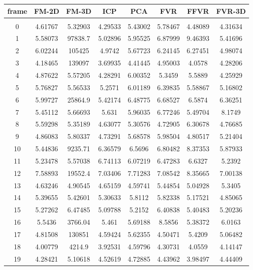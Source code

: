 \begin{center}
\begin{longtable}{cccccccc}
\hline
\textbf{frame} & \textbf{FM-2D} & \textbf{FM-3D} & \textbf{ICP} & \textbf{PCA} & \textbf{FVR} & \textbf{FFVR} & \textbf{FVR-3D} \\
\hline \\
0 & 4.61767 & 5.32903 & 4.29533 & 5.43002 & 5.78467 & 4.48089 & 4.31634\\
1 & 5.58073 & 97838.7 & 5.02896 & 5.95525 & 6.87999 & 9.46393 & 5.41696\\
2 & 6.02244 & 105425 & 4.9742 & 5.67723 & 6.24145 & 6.27451 & 4.98074\\
3 & 4.18465 & 139097 & 3.69935 & 4.41445 & 4.95003 & 4.0578 & 4.28206\\
4 & 4.87622 & 5.57205 & 4.28291 & 6.00352 & 5.3459 & 5.5889 & 4.25929\\
5 & 5.76827 & 5.56533 & 5.2571 & 6.01189 & 6.39835 & 5.58867 & 5.16802\\
6 & 5.99727 & 25864.9 & 5.42174 & 6.48775 & 6.68527 & 6.5874 & 6.36251\\
7 & 5.45112 & 5.66693 & 5.631 & 5.96035 & 6.77246 & 5.49704 & 8.1749\\
8 & 5.59298 & 5.35189 & 4.63077 & 5.30576 & 4.72905 & 6.30678 & 4.76685\\
9 & 4.86083 & 5.80337 & 4.73291 & 5.68578 & 5.98504 & 4.80517 & 5.21404\\
10 & 5.44836 & 9235.71 & 6.36579 & 6.5696 & 6.80482 & 8.37353 & 5.87933\\
11 & 5.23478 & 5.57038 & 6.74113 & 6.07219 & 6.47283 & 6.6327 & 5.2392\\
12 & 7.58893 & 19552.4 & 7.03406 & 7.71283 & 7.08542 & 8.35665 & 7.00138\\
13 & 4.63246 & 4.90545 & 4.65159 & 4.59741 & 5.44854 & 5.04928 & 5.3405\\
14 & 5.39655 & 5.42601 & 5.30633 & 5.8112 & 5.82338 & 5.17521 & 4.85065\\
15 & 5.27262 & 6.47485 & 5.09788 & 5.2152 & 6.40838 & 5.40483 & 5.20236\\
16 & 5.5436 & 3766.04 & 5.461 & 5.69188 & 8.5856 & 5.38372 & 6.0163\\
17 & 4.81508 & 130851 & 4.59424 & 5.62355 & 4.50471 & 5.4209 & 5.06482\\
18 & 4.00779 & 4214.9 & 3.92531 & 4.59796 & 4.30731 & 4.0559 & 4.14147\\
19 & 4.28421 & 5.10618 & 4.52619 & 4.72885 & 4.43962 & 3.98497 & 4.44409\\

\end{longtable}
\end{center}
